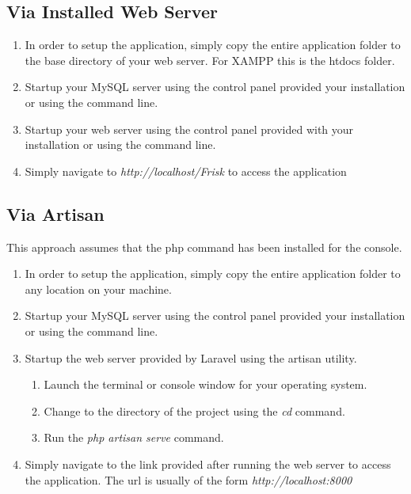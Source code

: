\documentclass[12pt]{article}
\begin{document}
\subsection{Via Installed Web Server}
\begin{enumerate}
	\item In order to setup the application, simply copy the entire application folder to the base directory of your web server. For XAMPP this is the htdocs folder.
	\item Startup your MySQL server using the control panel provided your installation or using the command line.
	\item Startup your web server using the control panel provided with your installation or using the command line.
	\item Simply navigate to \emph{http://localhost/Frisk} to access the application
\end{enumerate}

\subsection{Via Artisan}
This approach assumes that the php command has been installed for the console.
\begin{enumerate}
	\item In order to setup the application, simply copy the entire application folder to any location on your machine.
	\item Startup your MySQL server using the control panel provided your installation or using the command line.
	\item Startup the web server provided by Laravel using the artisan utility.
	\begin{enumerate}
		\item Launch the terminal or console window for your operating system.
		\item Change to the directory of the project using the \emph{cd} command.
		\item Run the \emph{php artisan serve} command.
	\end{enumerate}
	\item Simply navigate to the link provided after running the web server to access the application. The url is usually of the form \emph{http://localhost:8000}
\end{enumerate}
\end{document}

